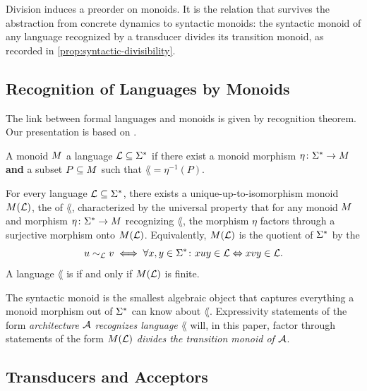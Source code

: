 \documentclass{article}
\begin{document}
Division induces a preorder on monoids. It is the relation that survives the abstraction from concrete dynamics to syntactic monoids: the syntactic monoid of any language recognized by a transducer divides its transition monoid, as recorded in \cref{prop:syntactic-divisibility}.

\subsection{Recognition of Languages by Monoids}

The link between formal languages and monoids is given by  recognition theorem.
Our presentation is based on \citet{eilenberg1976}.

\begin{definition}
A monoid $M$  a language $\mathcal{L} \subseteq \Sigma^*$ if there exist a monoid morphism $\eta \colon \Sigma^* \to M$ \textbf{and} a subset $P \subseteq M$ such that $\lang = \eta^{-1}(P)$.
\end{definition}

\begin{theorem}\label{thm:syntactic-monoid}
For every language $\mathcal{L} \subseteq \Sigma^*$, there exists a unique-up-to-isomorphism monoid $M(\mathcal{L})$, the  of $\lang$, characterized by the universal property that for any monoid $M$ and morphism $\eta\colon\Sigma^* \to M$ recognizing $\lang$, the morphism $\eta$ factors through a surjective morphism onto $M(\mathcal{L})$.
Equivalently, $M(\mathcal{L})$ is the quotient of $\Sigma^*$ by the 
$$
u \sim_{\mathcal{L}} v \iff \forall x, y \in \Sigma^*\colon  xuy \in \mathcal{L} \Leftrightarrow xvy \in \mathcal{L}.
$$
A language $\lang$ is  if and only if $M(\mathcal{L})$ is finite.
\end{theorem}

The syntactic monoid is the smallest algebraic object that captures everything a monoid morphism out of $\Sigma^*$ can know about $\lang$. 
Expressivity statements of the form \emph{architecture $\mathcal{A}$ recognizes language $\lang$} will, in this paper, factor through statements of the form \emph{$M(\mathcal{L})$ divides the transition monoid of $\mathcal{A}$}.

\subsection{Transducers and Acceptors}
\end{document}
